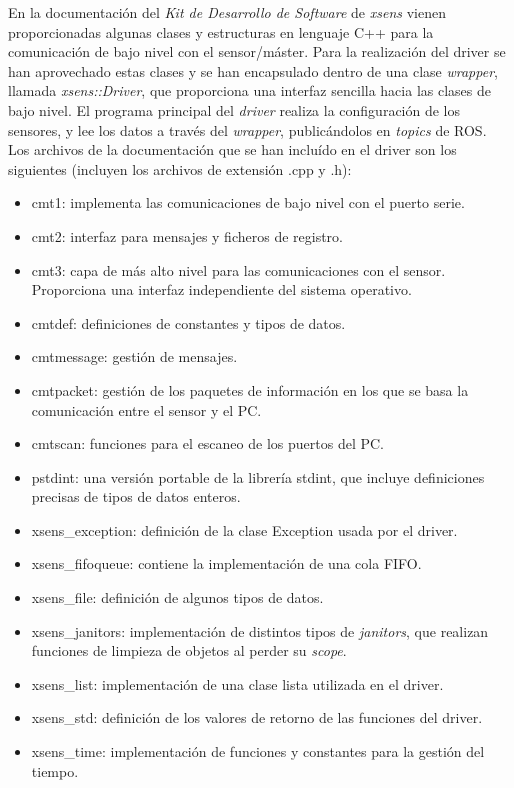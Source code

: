 \documentclass[12pt, a4paper]{report}
\begin{document}
En la documentación del \textit{Kit de Desarrollo de Software} de \textit{xsens} vienen proporcionadas algunas clases y estructuras en lenguaje C++ para la comunicación de bajo nivel con el sensor/máster. Para la realización del driver se han aprovechado estas clases y se han encapsulado dentro de una clase \textit{wrapper}, llamada \textit{xsens::Driver}, que proporciona una interfaz sencilla hacia las clases de bajo nivel. El programa principal del \textit{driver} realiza la configuración de los sensores, y lee los datos a través del \textit{wrapper}, publicándolos en \textit{topics} de ROS.\\

Los archivos de la documentación que se han incluído en el driver son los siguientes (incluyen los archivos de extensión .cpp y .h):

\begin{itemize}

\item cmt1: implementa las comunicaciones de bajo nivel con el puerto serie.
\item cmt2: interfaz para mensajes y ficheros de registro.
\item cmt3: capa de más alto nivel para las comunicaciones con el sensor. Proporciona una interfaz independiente del sistema operativo.
\item cmtdef: definiciones de constantes y tipos de datos.
\item cmtmessage: gestión de mensajes.
\item cmtpacket: gestión de los paquetes de información en los que se basa la comunicación entre el sensor y el PC.
\item cmtscan: funciones para el escaneo de los puertos del PC.
\item pstdint: una versión portable de la librería stdint, que incluye definiciones precisas de tipos de datos enteros. 
\item xsens\_exception: definición de la clase Exception usada por el driver.
\item xsens\_fifoqueue: contiene la implementación de una cola FIFO.
\item xsens\_file: definición de algunos tipos de datos.
\item xsens\_janitors: implementación de distintos tipos de \textit{janitors}, que realizan funciones de limpieza de objetos al perder su \textit{scope}.
\item xsens\_list: implementación de una clase lista utilizada en el driver.
\item xsens\_std: definición de los valores de retorno de las funciones del driver.
\item xsens\_time: implementación de funciones y constantes para la gestión del tiempo.

\end{itemize}
\end{document}

